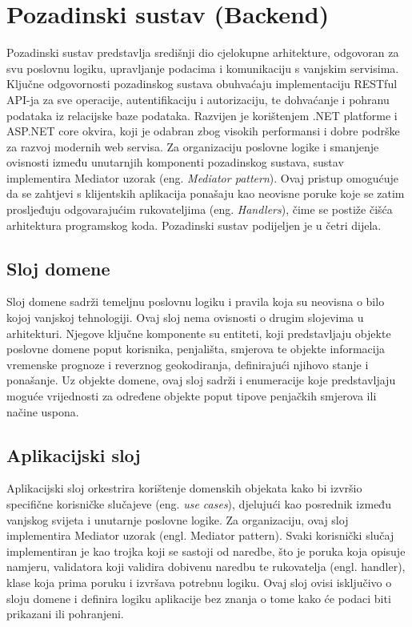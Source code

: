 \section{Pozadinski sustav (Backend)}

Pozadinski sustav predstavlja središnji dio cjelokupne arhitekture, odgovoran za svu poslovnu logiku, upravljanje podacima i komunikaciju s vanjskim servisima. Ključne odgovornosti pozadinskog sustava obuhvaćaju implementaciju RESTful API-ja za sve operacije, autentifikaciju i autorizaciju, te dohvaćanje i pohranu podataka iz relacijske baze podataka. Razvijen je korištenjem .NET platforme i ASP.NET core okvira, koji je odabran zbog visokih performansi i dobre podrške za razvoj modernih web servisa. Za organizaciju poslovne logike i smanjenje ovisnosti između unutarnjih komponenti pozadinskog sustava, sustav implementira Mediator uzorak (eng. \textit{Mediator pattern}). Ovaj pristup omogućuje da se zahtjevi s klijentskih aplikacija ponašaju kao neovisne poruke koje se zatim prosljeđuju odgovarajućim rukovateljima (eng. \textit{Handlers}), čime se postiže čišća arhitektura programskog koda. Pozadinski sustav podijeljen je u četri dijela.

\subsection{Sloj domene}

Sloj domene sadrži temeljnu poslovnu logiku i pravila koja su neovisna o bilo kojoj vanjskoj tehnologiji. Ovaj sloj nema ovisnosti o drugim slojevima u arhitekturi. Njegove ključne komponente su entiteti, koji predstavljaju objekte poslovne domene poput korisnika, penjališta, smjerova te objekte informacija vremenske prognoze i reverznog geokodiranja, definirajući njihovo stanje i ponašanje. Uz objekte domene, ovaj sloj sadrži i enumeracije koje predstavljaju moguće vrijednosti za određene objekte poput tipove penjačkih smjerova ili načine uspona.

\subsection{Aplikacijski sloj}

Aplikacijski sloj orkestrira korištenje domenskih objekata kako bi izvršio specifične korisničke slučajeve (eng. \textit {use cases}), djelujući kao posrednik između vanjskog svijeta i unutarnje poslovne logike. Za organizaciju, ovaj sloj implementira Mediator uzorak (engl. Mediator pattern). Svaki korisnički slučaj implementiran je kao trojka koji se sastoji od naredbe, što je poruka koja opisuje namjeru, validatora koji validira dobivenu naredbu te rukovatelja (engl. handler), klase koja prima poruku i izvršava potrebnu logiku. Ovaj sloj ovisi isključivo o sloju domene i definira logiku aplikacije bez znanja o tome kako će podaci biti prikazani ili pohranjeni.


